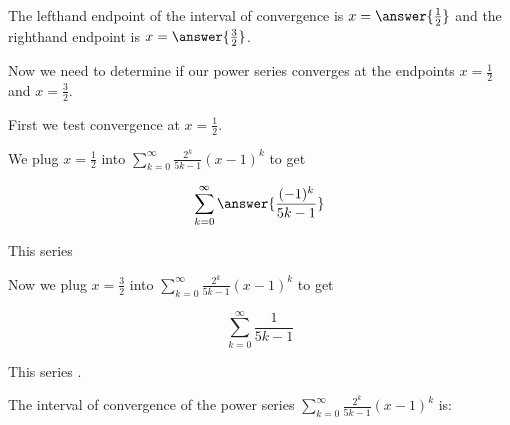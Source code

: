 \documentclass{ximera}
\begin{document}
\begin{exercise}
\begin{exercise}
\begin{exercise}
\begin{exercise}
\begin{exercise}
The lefthand endpoint of the interval of convergence is $x=\answer{\frac{1}{2}}$ and the righthand endpoint is $x= \answer{\frac{3}{2}}$.


\begin{exercise} 
Now we need to determine if our power series converges at the endpoints $x=\frac{1}{2}$ and $x=\frac{3}{2}$. 

First we test convergence at $x=\frac{1}{2}$. 

We plug $x=\frac{1}{2}$ into $\sum_{k=0}^{\infty} \frac{2^k}{5k-1}(x-1)^{k}$ to get

\[
\sum^{\infty}_{k=0} \answer{\frac{(-1)^k}{5k-1}}
\]


This series  

\begin{multipleChoice}
\end{multipleChoice}

Now we plug $x=\frac{3}{2}$ into $\sum_{k=0}^{\infty} \frac{2^k}{5k-1}(x-1)^{k}$ to get

\[
\sum^{\infty}_{k=0} \frac{1}{5k-1}
\]


This series . 




\begin{exercise}
The interval of convergence of the power series $\sum_{k=0}^{\infty} \frac{2^k}{5k-1}(x-1)^{k}$ is:
\begin{multipleChoice}
\choice{$\left(\frac{1}{2},\frac{3}{2}\right]$}
\choice[correct]{$\left[\frac{1}{2},\frac{3}{2}\right)$}
\end{multipleChoice}







\end{exercise}

\end{exercise}
\end{exercise}
\end{exercise}
\end{exercise}
\end{exercise}
\end{exercise}
\end{document}
